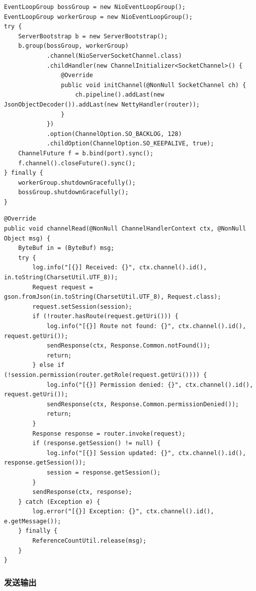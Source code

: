 \documentclass{article}
\begin{document}
\begin{lstlisting}
EventLoopGroup bossGroup = new NioEventLoopGroup();
EventLoopGroup workerGroup = new NioEventLoopGroup();
try {
    ServerBootstrap b = new ServerBootstrap();
    b.group(bossGroup, workerGroup)
            .channel(NioServerSocketChannel.class)
            .childHandler(new ChannelInitializer<SocketChannel>() {
                @Override
                public void initChannel(@NonNull SocketChannel ch) {
                    ch.pipeline().addLast(new JsonObjectDecoder()).addLast(new NettyHandler(router));
                }
            })
            .option(ChannelOption.SO_BACKLOG, 128)
            .childOption(ChannelOption.SO_KEEPALIVE, true);
    ChannelFuture f = b.bind(port).sync();
    f.channel().closeFuture().sync();
} finally {
    workerGroup.shutdownGracefully();
    bossGroup.shutdownGracefully();
}
\end{lstlisting}

\begin{lstlisting}
@Override
public void channelRead(@NonNull ChannelHandlerContext ctx, @NonNull Object msg) {
    ByteBuf in = (ByteBuf) msg;
    try {
        log.info("[{}] Received: {}", ctx.channel().id(), in.toString(CharsetUtil.UTF_8));
        Request request = gson.fromJson(in.toString(CharsetUtil.UTF_8), Request.class);
        request.setSession(session);
        if (!router.hasRoute(request.getUri())) {
            log.info("[{}] Route not found: {}", ctx.channel().id(), request.getUri());
            sendResponse(ctx, Response.Common.notFound());
            return;
        } else if (!session.permission(router.getRole(request.getUri()))) {
            log.info("[{}] Permission denied: {}", ctx.channel().id(), request.getUri());
            sendResponse(ctx, Response.Common.permissionDenied());
            return;
        }
        Response response = router.invoke(request);
        if (response.getSession() != null) {
            log.info("[{}] Session updated: {}", ctx.channel().id(), response.getSession());
            session = response.getSession();
        }
        sendResponse(ctx, response);
    } catch (Exception e) {
        log.error("[{}] Exception: {}", ctx.channel().id(), e.getMessage());
    } finally {
        ReferenceCountUtil.release(msg);
    }
}
\end{lstlisting}


\subsubsection{发送输出}
\end{document}
